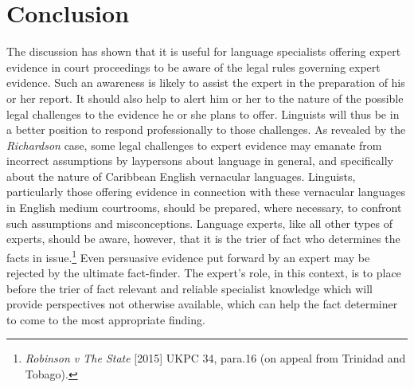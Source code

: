 \documentclass[output=paper,colorlinks,citecolor=brown]{langscibook}
\begin{document}
\section{Conclusion}

The discussion has shown that it is useful for language specialists offering expert evidence in court proceedings to be aware of the legal rules governing expert evidence. Such an awareness is likely to assist the expert in the preparation of his or her report. It should also help to alert him or her to the nature of the possible legal challenges to the evidence he or she plans to offer. Linguists will thus be in a better position to respond professionally to those challenges. As revealed by the \emph{Richardson} case, some legal challenges to expert evidence may emanate from incorrect assumptions by laypersons about language in general, and specifically about the nature of Caribbean English vernacular languages. Linguists, particularly those offering evidence in connection with these vernacular languages in English medium courtrooms, should be prepared, where necessary, to confront such assumptions and misconceptions. Language experts, like all other types of experts, should be aware, however, that it is the trier of fact who determines the facts in issue.\footnote{\emph{Robinson v The State} [2015] UKPC 34, para.16 (on appeal from Trinidad and Tobago).} Even persuasive evidence put forward by an expert may be rejected by the ultimate fact-finder. The expert’s role, in this context, is to place before the trier of fact relevant and reliable specialist knowledge which will provide perspectives not otherwise available, which can help the fact determiner to come to the most appropriate finding.   


{\sloppy\printbibliography[heading=subbibliography,notkeyword=this]}
\end{document}
